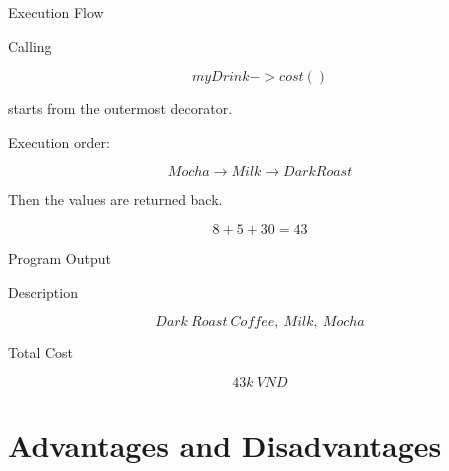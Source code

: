 \documentclass[aspectratio=169]{beamer}
\begin{document}

\begin{frame}{Execution Flow}

Calling

\[
myDrink->cost()
\]

starts from the outermost decorator.

\bigskip

Execution order:

\[
Mocha
\rightarrow
Milk
\rightarrow
DarkRoast
\]

Then the values are returned back.

\[
8
+5
+30
=
43
\]

\end{frame}


\begin{frame}{Program Output}

\Large

Description

\[
\boxed{
Dark\ Roast\ Coffee,\ Milk,\ Mocha
}
\]

Total Cost

\[
\boxed{43k\ VND}
\]

\end{frame}


\section{Advantages and Disadvantages}
\end{document}
